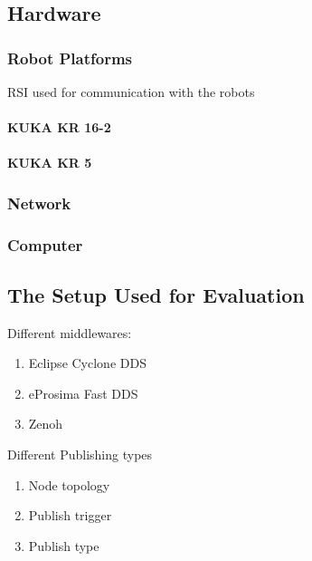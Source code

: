 \chapter{}
\label{sec:results}
\section{Hardware }

\subsection{Robot Platforms}
RSI used for communication with the robots
\subsubsection{KUKA KR 16-2}


\subsubsection{KUKA KR 5}



\subsection{Network}


\subsection{Computer}




\section{The Setup Used for Evaluation}
Different middlewares:
\begin{enumerate}
    \item Eclipse Cyclone DDS
    \item eProsima Fast DDS
    \item Zenoh
\end{enumerate}
Different Publishing types
\begin{enumerate}
    \item Node topology
    \item Publish trigger
    \item Publish type 
\end{enumerate}

